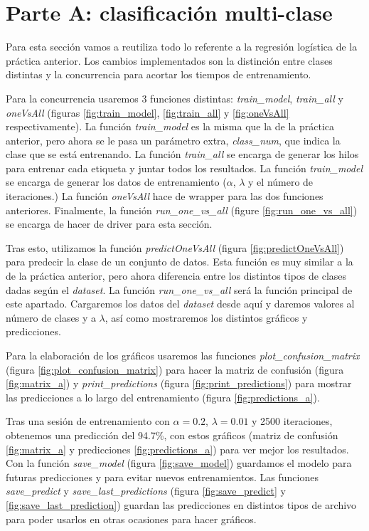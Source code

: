 \documentclass[6pt]{../../shared/AiTex}
\begin{document}
\section{Parte A: clasificación multi-clase}

Para esta sección vamos a reutiliza todo lo referente a la regresión logística de la práctica anterior. Los cambios implementados son la distinción entre clases distintas y la concurrencia para acortar los tiempos de entrenamiento.

Para la concurrencia usaremos 3 funciones distintas: \textit{train\_model}, \textit{train\_all} y \textit{oneVsAll} (figuras \ref{fig:train_model}, \ref{fig:train_all} y \ref{fig:oneVsAll} respectivamente). La función \textit{train\_model} es la misma que la de la práctica anterior, pero ahora se le pasa un parámetro extra, \textit{class\_num}, que indica la clase que se está entrenando. La función \textit{train\_all} se encarga de generar los hilos para entrenar cada etiqueta y juntar todos los resultados. La función \textit{train\_model} se encarga de generar los datos de entrenamiento ($\alpha$, $\lambda$ y el número de iteraciones.) La función \textit{oneVsAll} hace de wrapper para las dos funciones anteriores. Finalmente, la función \textit{run\_one\_vs\_all} (figure \ref{fig:run_one_vs_all}) se encarga de hacer de driver para esta sección.

Tras esto, utilizamos la función \textit{predictOneVsAll} (figura \ref{fig:predictOneVsAll}) para predecir la clase de un conjunto de datos. Esta función es muy similar a la de la práctica anterior, pero ahora diferencia entre los distintos tipos de clases dadas según el \textit{dataset}. La función \textit{run\_one\_vs\_all} será la función principal de este apartado. Cargaremos los datos del \textit{dataset} desde aquí y daremos valores al número de clases y a $\lambda$, así como mostraremos los distintos gráficos y predicciones.

Para la elaboración de los gráficos usaremos las funciones \textit{plot\_confusion\_matrix} (figura \ref{fig:plot_confusion_matrix}) para hacer la matriz de confusión (figura \ref{fig:matrix_a}) y \textit{print\_predictions} (figura \ref{fig:print_predictions}) para mostrar las predicciones a lo largo del entrenamiento (figura \ref{fig:predictions_a}).

Tras una sesión de entrenamiento con $\alpha = 0.2$, $\lambda = 0.01$ y 2500 iteraciones, obtenemos una predicción del 94.7\%, con estos gráficos (matriz de confusión \ref{fig:matrix_a} y predicciones \ref{fig:predictions_a}) para ver mejor los resultados. Con la función \textit{save\_model} (figura \ref{fig:save_model}) guardamos el modelo para futuras predicciones y para evitar nuevos entrenamientos. Las funciones \textit{save\_predict} y \textit{save\_last\_predictions} (figura \ref{fig:save_predict} y \ref{fig:save_last_prediction}) guardan las predicciones en distintos tipos de archivo para poder usarlos en otras ocasiones para hacer gráficos.
\end{document}

